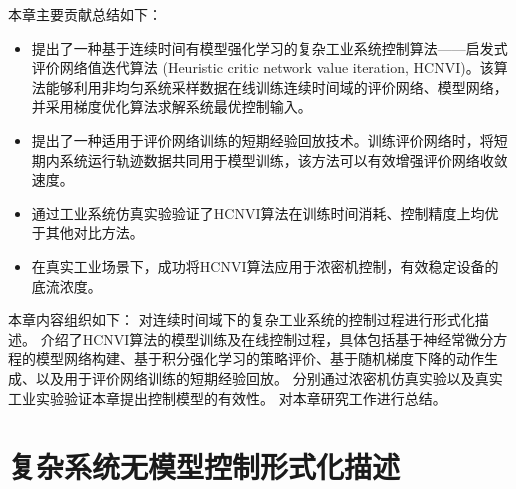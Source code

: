 本章主要贡献总结如下：
\begin{itemize}[nosep]
\item  提出了一种基于连续时间有模型强化学习的复杂工业系统控制算法——启发式评价网络值迭代算法
(Heuristic critic network value iteration,
HCNVI)。该算法能够利用非均匀系统采样数据在线训练连续时间域的评价网络、模型网络，并采用梯度优化算法求解系统最优控制输入。
\item  提出了一种适用于评价网络训练的短期经验回放技术。训练评价网络时，将短期内系统运行轨迹数据共同用于模型训练，该方法可以有效增强评价网络收敛速度。
\item  通过工业系统仿真实验验证了HCNVI算法在训练时间消耗、控制精度上均优于其他对比方法。
\item  在真实工业场景下，成功将HCNVI算法应用于浓密机控制，有效稳定设备的底流浓度。
\end{itemize}

本章内容组织如下： 
对连续时间域下的复杂工业系统的控制过程进行形式化描述。
介绍了HCNVI算法的模型训练及在线控制过程，具体包括基于神经常微分方程的模型网络构建、基于积分强化学习的策略评价、基于随机梯度下降的动作生成、以及用于评价网络训练的短期经验回放。
分别通过浓密机仿真实验以及真实工业实验验证本章提出控制模型的有效性。
对本章研究工作进行总结。

\section{复杂系统无模型控制形式化描述}
\label{sec:formulation}

